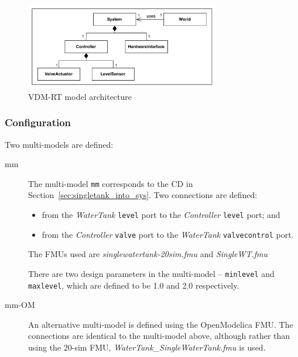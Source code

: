 \begin{description}
\begin{figure}[htbp]
\begin{center}
\includegraphics[width=0.755\textwidth]{singletank/vdmrtarch.png}
\caption{VDM-RT model architecture}
\label{fig:singletank20-vdm}
\end{center}
\end{figure}

\end{description}

\subsubsection{Configuration}
\label{sec:singletank_into_conf}
Two multi-models are defined:
\begin{description}
\item[mm] The multi-model \texttt{mm} corresponds to the CD in Section~\ref{sec:singletank_into_sys}. Two connections are defined:

\begin{itemize}
  \item from the \emph{WaterTank} \texttt{level} port to the \emph{Controller} \texttt{level} port; and 
  \item from the \emph{Controller} \texttt{valve} port to the \emph{WaterTank} \texttt{valvecontrol} port. 
\end{itemize}

The FMUs used are \emph{singlewatertank-20sim.fmu} and \emph{SingleWT.fmu}

There are two design parameters in the multi-model -- \texttt{minlevel} and \texttt{maxlevel}, which are defined to be 1.0 and 2.0 respectively. 

\item [mm-OM] An alternative multi-model is defined using the OpenModelica FMU. The connections are identical to the multi-model above, although rather than using the 20-sim FMU, \emph{WaterTank\_SingleWaterTank.fmu} is used.

\end{description}


